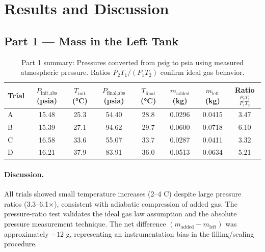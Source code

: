 \documentclass[12pt]{article}
\begin{document}
\section*{Results and Discussion}

\subsection*{Part 1 — Mass in the Left Tank}
\begin{table}[H]\centering
\caption{Part 1 summary: Pressures converted from psig to psia using measured atmospheric pressure. Ratios $P_2T_1/(P_1T_2)$ confirm ideal gas behavior.}
\label{tab:part1}
\begin{tabular}{@{}lccccccc@{}}
\toprule
Trial & $P_{\text{init,abs}}$ (psia) & $T_{\text{init}}$ (\si{\celsius}) & $P_{\text{final,abs}}$ (psia) & $T_{\text{final}}$ (\si{\celsius}) & $m_{\text{added}}$ (kg) & $m_{\text{left}}$ (kg) & Ratio $\frac{P_2T_1}{P_1T_2}$ \\
\midrule
A & 15.48 & 25.3 & 54.40 & 28.8 & 0.0296 & 0.0415 & 3.47 \\
B & 15.39 & 27.1 & 94.62 & 29.7 & 0.0600 & 0.0718 & 6.10 \\
C & 16.58 & 33.6 & 55.07 & 33.7 & 0.0287 & 0.0411 & 3.32 \\
D & 16.21 & 37.9 & 83.91 & 36.0 & 0.0513 & 0.0634 & 5.21 \\
\bottomrule
\end{tabular}
\end{table}

\paragraph{Discussion.} All trials showed small temperature increases (2–4 \textdegree C) despite large pressure ratios (3.3–6.1×), consistent with adiabatic compression of added gas. The pressure-ratio test validates the ideal gas law assumption and the absolute pressure measurement technique. The net difference $(m_{\text{added}} - m_{\text{left}})$ was approximately $-12$ g, representing an instrumentation bias in the filling/sealing procedure.
\end{document}
